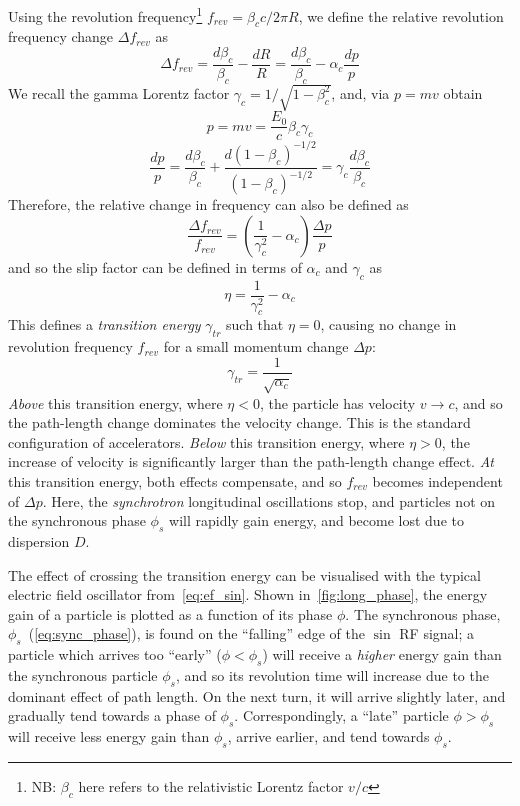 \documentclass[11pt]{report}
\begin{document}
Using the revolution frequency\footnote{NB: $\beta_c$ here refers to the relativistic Lorentz factor $v/c$ } $f_{rev}=\beta_c c/2\pi R$, we define the relative revolution frequency change $\Delta f_{rev}$ as
\begin{equation}
  \Delta f_{rev} = \frac{d\beta_c}{\beta_c}-\frac{dR}R=\frac{d\beta_c}{\beta_c}-\alpha_c\frac{dp}p
\end{equation} 
We recall the gamma Lorentz factor $\gamma_c =1/\sqrt{1-\beta_c^2}$, and, via $p=mv$ obtain
\begin{equation}
  p=mv=\frac {E_0}c \beta_c\gamma_c
\end{equation}
\begin{equation}
  \frac{dp}p =\frac{d\beta_c}{\beta_c}+\frac{d(1-\beta_c)^{-1/2}}{(1-\beta_c)^{-1/2}}=\gamma_c\frac{d\beta_c}{\beta_c}
\end{equation}
Therefore, the relative change in frequency can also be defined as
\begin{equation}
  \frac{\Delta f_{rev}}{f_{rev}}=\left(\frac 1{\gamma_c^2}-\alpha_c\right)\frac{\Delta p}p
\end{equation}
and so the slip factor can be defined in terms of $\alpha_c$ and $\gamma_c$ as
\begin{equation}
  \eta = \frac 1{\gamma_c^2}-\alpha_c
\end{equation}
This defines a \textit{transition energy} $\gamma_{tr}$ such that $\eta=0$, causing no change in revolution frequency $f_{rev}$ for a small momentum change $\Delta p$:
\begin{equation}
  \gamma_{tr}=\frac 1{\sqrt{\alpha_c}}
\end{equation}
\textit{Above} this transition energy, where $\eta<0$, the particle has velocity $v\rightarrow c$, and so the path-length change dominates the velocity change. This is the standard configuration of accelerators.
\textit{Below} this transition energy, where $\eta >0$, the increase of velocity is significantly larger than the path-length change effect.
\textit{At} this transition energy, both effects compensate, and so $f_{rev}$ becomes independent of $\Delta p$. Here, the \textit{synchrotron} longitudinal oscillations stop, and particles not on the synchronous phase $\phi_s$ will rapidly gain energy, and become lost due to dispersion $D$.

The effect of crossing the transition energy can be visualised with the typical electric field oscillator from~\autoref{eq:ef_sin}. Shown in~\autoref{fig:long_phase}, the energy gain of a particle is plotted as a function of its phase $\phi$. The synchronous phase, $\phi_s$~(\autoref{eq:sync_phase}), is found on the ``falling'' edge of the $\sin$ RF signal; a particle which arrives too ``early'' ($\phi<\phi_s$) will receive a \textit{higher} energy gain than the synchronous particle $\phi_s$, and so its revolution time will increase due to the dominant effect of path length. On the next turn, it will arrive slightly later, and gradually tend towards a phase of $\phi_s$. Correspondingly, a ``late'' particle $\phi > \phi_s$ will receive less energy gain than $\phi_s$, arrive earlier, and tend towards $\phi_s$.
\end{document}

